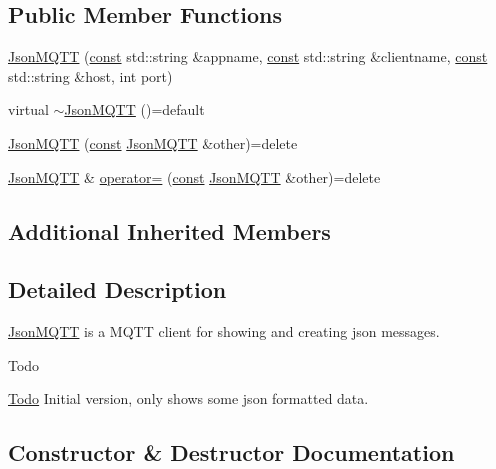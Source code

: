 \subsection*{Public Member Functions}
\begin{DoxyCompactItemize}
\item 
\hyperlink{class_json_m_q_t_t_afc030151aed2f235a84b6c33c2150e1f}{Json\+M\+Q\+TT} (\hyperlink{functions__c_8js_afacfd9c985d225bb07483b887a801b6f}{const} std\+::string \&appname, \hyperlink{functions__c_8js_afacfd9c985d225bb07483b887a801b6f}{const} std\+::string \&clientname, \hyperlink{functions__c_8js_afacfd9c985d225bb07483b887a801b6f}{const} std\+::string \&host, int port)
\item 
virtual \hyperlink{class_json_m_q_t_t_adf3fdba6871b0de2a050027f196ea9a5}{$\sim$\+Json\+M\+Q\+TT} ()=default
\item 
\hyperlink{class_json_m_q_t_t_a4cbaff047dbd0853b31c8790ba0972b6}{Json\+M\+Q\+TT} (\hyperlink{functions__c_8js_afacfd9c985d225bb07483b887a801b6f}{const} \hyperlink{class_json_m_q_t_t}{Json\+M\+Q\+TT} \&other)=delete
\item 
\hyperlink{class_json_m_q_t_t}{Json\+M\+Q\+TT} \& \hyperlink{class_json_m_q_t_t_a70c51b05ba52a152f6c02ea8a7a7070b}{operator=} (\hyperlink{functions__c_8js_afacfd9c985d225bb07483b887a801b6f}{const} \hyperlink{class_json_m_q_t_t}{Json\+M\+Q\+TT} \&other)=delete
\end{DoxyCompactItemize}
\subsection*{Additional Inherited Members}


\subsection{Detailed Description}
\hyperlink{class_json_m_q_t_t}{Json\+M\+Q\+TT} is a M\+Q\+TT client for showing and creating json messages. \begin{DoxyRefDesc}{Todo}
\item[\hyperlink{todo__todo000003}{Todo}]Initial version, only shows some json formatted data. \end{DoxyRefDesc}


\subsection{Constructor \& Destructor Documentation}
